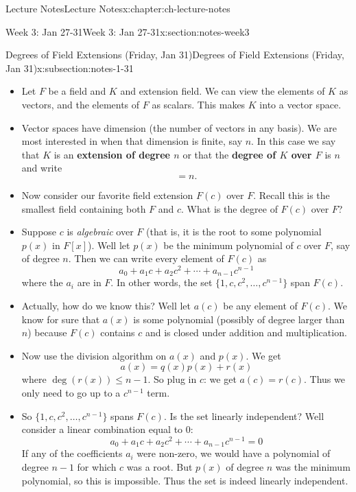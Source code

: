 \documentclass[oneside,11pt,]{book}
\newcommand{\terminology}[1]{\textbf{#1}}
\begin{document}
\begin{chapterptx}{Lecture Notes}{}{Lecture Notes}{}{}{x:chapter:ch-lecture-notes}
\begin{sectionptx}{Week 3: Jan 27-31}{}{Week 3: Jan 27-31}{}{}{x:section:notes-week3}
\begin{subsectionptx}{Degrees of Field Extensions (Friday, Jan 31)}{}{Degrees of Field Extensions (Friday, Jan 31)}{}{}{x:subsection:notes-1-31}
\par
%
\begin{itemize}[label=\textbullet]
\item{}Let \(F\) be a field and \(K\) and extension field. We can view the elements of \(K\) as vectors, and the elements of \(F\) as scalars. This makes \(K\) into a vector space.%
\item{}Vector spaces have dimension (the number of vectors in any basis). We are most interested in when that dimension is finite, say \(n\). In this case we say that \(K\) is an \terminology{extension of degree \(n\)} or that the \terminology{degree of \(K\) over \(F\)} is \(n\) and write%
\begin{equation*}
[K:F]=n.
\end{equation*}
%
\item{}Now consider our favorite field extension \(F(c)\) over \(F\). Recall this is the smallest field containing both \(F\) and \(c\). What is the degree of \(F(c)\) over \(F\)?%
\item{}Suppose \(c\) is \emph{algebraic} over \(F\) (that is, it is the root to some polynomial \(p(x)\) in \(F[x]\)). Well let \(p(x)\) be the minimum polynomial of \(c\) over \(F\), say of degree \(n\). Then we can write every element of \(F(c)\) as%
\begin{equation*}
a_0 + a_1c + a_2c^2 + \cdots +a_{n-1}c^{n-1}
\end{equation*}
where the \(a_i\) are in \(F\). In other words, the set \(\{1, c, c^2,\ldots, c^{n-1}\}\) span \(F(c)\).%
\item{}Actually, how do we know this? Well let \(a(c)\) be any element of \(F(c)\). We know for sure that \(a(x)\) is some polynomial (possibly of degree larger than \(n\)) because \(F(c)\) contains \(c\) and is closed under addition and multiplication.%
\item{}Now use the division algorithm on \(a(x)\) and \(p(x)\). We get%
\begin{equation*}
a(x) = q(x)p(x) + r(x)
\end{equation*}
where \(\deg(r(x)) \le n-1\). So plug in \(c\): we get \(a(c) = r(c)\). Thus we only need to go up to a \(c^{n-1}\) term.%
\item{}So \(\{1, c, c^2, \ldots, c^{n-1}\}\) spans \(F(c)\). Is the set linearly independent? Well consider a linear combination equal to 0:%
\begin{equation*}
a_0 + a_1c + a_2c^2 + \cdots + a_{n-1}c^{n-1} = 0
\end{equation*}
If any of the coefficients \(a_i\) were non-zero, we would have a polynomial of degree \(n-1\) for which \(c\) was a root. But \(p(x)\) of degree \(n\) was the minimum polynomial, so this is impossible. Thus the set is indeed linearly independent.%

\end{itemize}
\end{subsectionptx}
\end{sectionptx}
\end{chapterptx}
\end{document}
